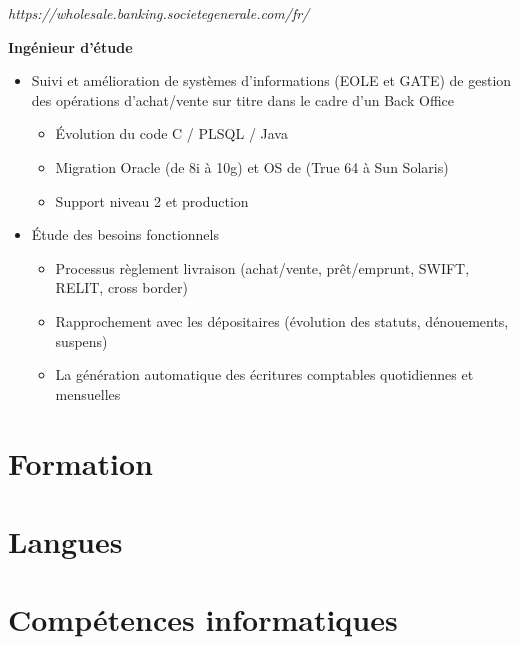 \documentclass[11pt,a4paper]{moderncv}
\begin{document}
\bigskip
{}
{
	\textit{https://wholesale.banking.societegenerale.com/fr/}

	\bigskip
	\textbf{Ingénieur d'étude}
\bigskip
\begin{itemize}
\item Suivi et amélioration de systèmes d'informations (EOLE et GATE) de gestion des opérations d'achat/vente sur titre dans le cadre d'un Back Office
	\begin{itemize}
		\item Évolution du code C / PLSQL / Java
		\item Migration Oracle (de 8i à 10g) et OS de (True 64 à Sun Solaris)
		\item Support niveau 2 et production
\end{itemize}
\bigskip
\item Étude des besoins fonctionnels
	\begin{itemize}
		\item Processus règlement livraison (achat/vente, prêt/emprunt, SWIFT, RELIT, cross border)
		\item Rapprochement avec les dépositaires (évolution des statuts, dénouements, suspens)
		\item La génération automatique des écritures comptables quotidiennes et mensuelles
	\end{itemize}
\end{itemize}
}
\bigskip

\section{Formation}


\section{Langues}

\section{Compétences informatiques}
\bigskip
\end{document}
